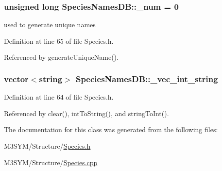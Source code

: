 \hypertarget{classSpeciesNamesDB_a8339994ccc621359cf8de735865be6a7}{
\subsubsection[{\+\_\+num}]{\setlength{\rightskip}{0pt plus 5cm}unsigned long Species\+Names\+D\+B\+::\+\_\+num = 0\hspace{0.3cm}{\ttfamily [private]}}}\label{classSpeciesNamesDB_a8339994ccc621359cf8de735865be6a7}


used to generate unique names 



Definition at line 65 of file Species.\+h.



Referenced by generate\+Unique\+Name().

\hypertarget{classSpeciesNamesDB_a668ee868496f58154d860caef5fc64cc}{
\subsubsection[{\+\_\+vec\+\_\+int\+\_\+string}]{\setlength{\rightskip}{0pt plus 5cm}vector$<$string$>$ Species\+Names\+D\+B\+::\+\_\+vec\+\_\+int\+\_\+string\hspace{0.3cm}{\ttfamily [private]}}}\label{classSpeciesNamesDB_a668ee868496f58154d860caef5fc64cc}


Definition at line 64 of file Species.\+h.



Referenced by clear(), int\+To\+String(), and string\+To\+Int().



The documentation for this class was generated from the following files\+:\begin{DoxyCompactItemize}
\item 
M3\+S\+Y\+M/\+Structure/\hyperlink{Species_8h}{Species.\+h}\item 
M3\+S\+Y\+M/\+Structure/\hyperlink{Species_8cpp}{Species.\+cpp}\end{DoxyCompactItemize}
